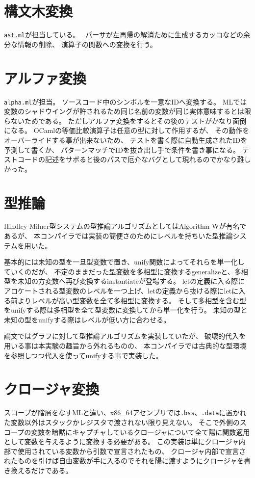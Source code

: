 \documentclass[report]{jlreq}
\begin{document}
    \section{構文木変換}
      \texttt{ast.ml}が担当している。　
      パーサが左再帰の解消ために生成するカッコなどの余分な情報の削除、
      演算子の関数への変換を行う。
    \section{アルファ変換}
      \texttt{alpha.ml}が担当。
      ソースコード中のシンボルを一意なIDへ変換する。
      MLでは変数のシャドウイングが許されるため同じ名前の変数が同じ実体意味するとは限らないためである。
      ただしアルファ変換をするとその後のテストがかなり面倒になる。
      OCamlの等価比較演算子は任意の型に対して作用するが、
      その動作をオーバーライドする事が出来ないため、
      テストを書く際に自動生成されたIDを予測して書くか、
      パターンマッチでIDを抜き出し手で条件を書き事になる。
      テストコードの記述をサボると後のパスで厄介なバグとして現れるのでかなり難しかった。
    \section{型推論}
      Hindley-Milner型システム\cite{hindley1969the,milner1978a}の型推論アルゴリズムとしてはAlgorithm W\cite{damas1982principal}が有名であるが、
      本コンパイラでは実装の簡便さのためにレベルを持ちいた型推論システム\cite{remy1992extension}を用いた。

      基本的には未知の型を一旦型変数で置き、unify関数によってそれらを単一化していくのだが、
      不定のままだった型変数を多相型に変換するgeneralizeと、多相型を未知の方変数へ再び変換するinstantiateが登場する。
      letの定義に入る際にアロケートされる型変数のレベルを一つ上げ、letの定義から抜ける際にletに入る前よりレベルが高い型変数を全て多相型に変換する。
      そして多相型を含む型をunifyする際は多相型を全て型変数に変換してから単一化を行う。
      未知の型と未知の型をunifyする際はレベルが低い方に合わせる。

      論文\cite{remy1992extension}ではグラフに対して型推論アルゴリズムを実装していたが、
      破壊的代入を用いる事は本実験の趣旨から外れるものの、
      本コンパイラでは古典的な型環境を参照しつつ代入を使ってunifyする事で実装した。

    \section{クロージャ変換}
      スコープが階層をなすMLと違い、x86\_64アセンブリでは\texttt{.bss}、\texttt{.data}に置かれた変数以外はスタックかレジスタで渡されない限り見えない。
      そこで外側のスコープの変数を暗黙にキャプチャしているクロージャについて全て陽に関数適用として変数を与えるように変換する必要がある。
      この実装は単にクロージャ内部で使用されている変数から引数で宣言されたもの、
      クロージャ内部で宣言されたものを引けば自由変数が手に入るのでそれを陽に渡すようにクロージャを書き換えるだけである。
\end{document}
